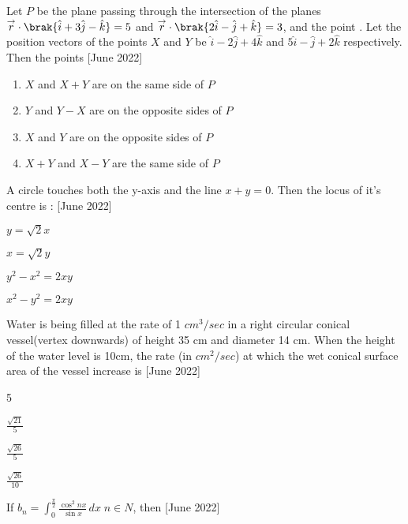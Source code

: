 \bigskip
\item Let $P$ be the plane passing through the intersection of the planes $\overset{\rightarrow}{r}\cdot \brak{\hat{i}+3\hat{j}-\hat{k}}=5$ and $\overset{\rightarrow}{r}\cdot \brak{2\hat{i}-\hat{j}+\hat{k}}=3$, and the point . Let the position vectors of the points $X$ and $Y$ be $\hat{i}-2\hat{j}+4\hat{k}$ and $5\hat{i}-\hat{j}+2\hat{k}$ respectively. Then the points \hfill{[June 2022]}
\begin{enumerate}
    \item $X$ and $X+Y$ are on the same side of $P$
    \item $Y$ and $Y-X$ are on the opposite sides of $P$
    \item $X$ and $Y$ are on the opposite sides of $P$
    \item $X+Y$ and $X-Y$ are the same side of $P$
\end{enumerate}
\bigskip
\item A circle touches both the y-axis and the line $x+y=0$. Then the locus of it's centre is : \hfill{[June 2022]}
\begin{enumerate}
\begin{multicols}{2}
\item $y=\sqrt{2}x$
\columnbreak
    \item $x=\sqrt{2}y$
\end{multicols}
\begin{multicols}{2}
\item $y^2-x^2=2xy$
\item $x^2 - y^2 =2xy$
\end{multicols}
\end{enumerate}
\bigskip
\item Water is being filled at the rate of 1 ${cm}^3/sec$ in a right circular conical vessel(vertex downwards) of height 35 cm and diameter 14 cm. When the height of the water level is 10cm, the rate (in ${cm}^2/sec$) at which the wet conical surface area of the vessel increase is \hfill{[June 2022]}
\begin{enumerate}
\begin{multicols}{4}
\item 5
\item $\frac{\sqrt{21}}{5}$
\item $\frac{\sqrt{26}}{5}$
\item $\frac{\sqrt{26}}{10}$
\end{multicols}
\end{enumerate}
\bigskip
\item If $b_n = \int_{0}^{\frac{\pi}{2}} \frac{\cos^2{nx}}{\sin{x}}\,dx\;n \in N$, then \hfill{[June 2022]}
